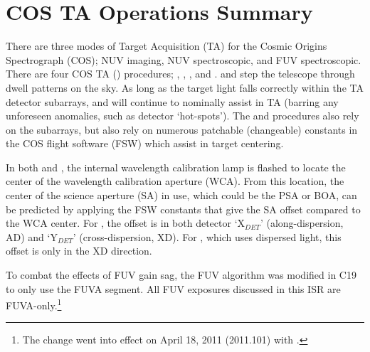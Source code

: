 \section{COS TA Operations Summary}\label{sec:TAoperations}

There are three modes of Target Acquisition (TA) for the Cosmic Origins Spectrograph (COS); NUV imaging, NUV spectroscopic, and FUV spectroscopic.
There are four COS TA (\tacq{}) procedures; , , , and .
 and  step the telescope through dwell patterns on the sky.
As long as the target light falls correctly within the TA detector subarrays,  and  will continue to nominally assist in TA (barring any unforeseen anomalies, such as detector `hot-spots').
The  and  procedures also rely on the subarrays, but also rely on numerous patchable (changeable) constants
in the COS flight software (FSW) which assist in target centering.

In both  and , the internal wavelength calibration lamp is flashed to locate the center of the wavelength calibration aperture (WCA).
From this location, the center of the science aperture (SA) in use, which could be the PSA or BOA, can be predicted by applying the FSW constants that give the SA offset compared to the WCA center. For ,
the offset is in both detector `X$_{DET}$' (along-dispersion, AD) and `Y$_{DET}$' (cross-dispersion, XD).
For , which uses dispersed light, this offset is only in the XD direction.

To combat the effects of FUV gain sag, the FUV  algorithm was modified in C19 to only use the FUVA segment. All FUV  exposures discussed in this ISR are FUVA-only.\footnote{The change went into effect on April 18, 2011 (2011.101) with .}

